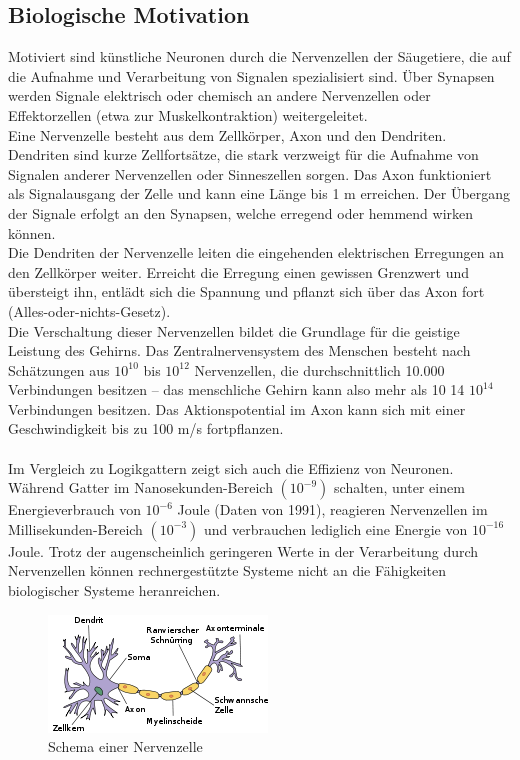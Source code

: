 \subsection{Biologische Motivation}
Motiviert sind künstliche Neuronen durch die Nervenzellen der Säugetiere, die auf die Aufnahme und Verarbeitung von Signalen spezialisiert sind. Über Synapsen werden Signale elektrisch oder chemisch an andere Nervenzellen oder Effektorzellen (etwa zur Muskelkontraktion) weitergeleitet.\\
Eine Nervenzelle besteht aus dem Zellkörper, Axon und den Dendriten. Dendriten sind kurze Zellfortsätze, die stark verzweigt für die Aufnahme von Signalen anderer Nervenzellen oder Sinneszellen sorgen. Das Axon funktioniert als Signalausgang der Zelle und kann eine Länge bis 1 m erreichen. Der Übergang der Signale erfolgt an den Synapsen, welche erregend oder hemmend wirken können.\\
Die Dendriten der Nervenzelle leiten die eingehenden elektrischen Erregungen an den Zellkörper weiter. Erreicht die Erregung einen gewissen Grenzwert und übersteigt ihn, entlädt sich die Spannung und pflanzt sich über das Axon fort (Alles-oder-nichts-Gesetz).
\\
Die Verschaltung dieser Nervenzellen bildet die Grundlage für die geistige Leistung des Gehirns. Das Zentralnervensystem des Menschen besteht nach Schätzungen aus ${\displaystyle 10^{10}}$ bis ${\displaystyle 10^{12}}$ Nervenzellen, die durchschnittlich 10.000 Verbindungen besitzen – das menschliche Gehirn kann also mehr als 10 14 ${\displaystyle 10^{14}}$ Verbindungen besitzen. Das Aktionspotential im Axon kann sich mit einer Geschwindigkeit bis zu 100 m/s fortpflanzen.\\
\\
Im Vergleich zu Logikgattern zeigt sich auch die Effizienz von Neuronen. Während Gatter im Nanosekunden-Bereich $(10^{-9})$ schalten, unter einem Energieverbrauch von $10^{-6}$ Joule (Daten von 1991), reagieren Nervenzellen im Millisekunden-Bereich $(10^{-3})$ und verbrauchen lediglich eine Energie von $10^{-16}$ Joule. Trotz der augenscheinlich geringeren Werte in der Verarbeitung durch Nervenzellen können rechnergestützte Systeme nicht an die Fähigkeiten biologischer Systeme heranreichen.\\
\begin{figure}[h]
\centering
\includegraphics[width=0.7\linewidth]{pics/zelle.png}
\caption[Nervenzelle]{Schema einer Nervenzelle}
\label{fig:zelle}
\end{figure}
